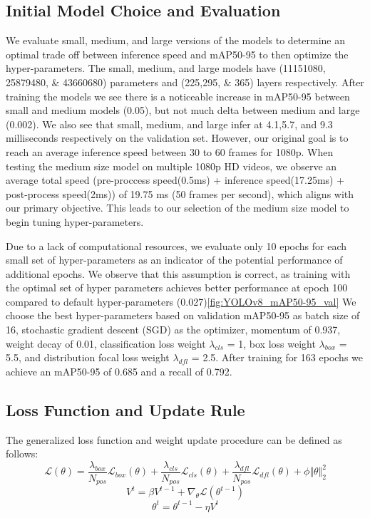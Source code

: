 \documentclass[10pt,twocolumn,letterpaper]{article}
\begin{document}
\subsection{Initial Model Choice and Evaluation}

We evaluate small, medium, and large versions of the models to determine an optimal trade off between inference speed and mAP50-95 to then optimize the hyper-parameters. The small, medium, and large models have (11151080, 25879480, \& 43660680) parameters and (225,295, \& 365) layers respectively. After training the models we see there is a noticeable increase in mAP50-95 between small and medium models (0.05), but not much delta between medium and large (0.002). We also see that small, medium, and large infer at 4.1,5.7, and 9.3 milliseconds respectively on the validation set. However, our original goal is to reach an average inference speed between 30 to 60 frames for 1080p. When testing the medium size model on multiple 1080p HD videos, we observe an average total speed (pre-proccess speed(0.5ms) + inference speed(17.25ms) + post-process speed(2ms)) of 19.75 ms (50 frames per second), which aligns with our primary objective. This leads to our selection of the medium size model to begin tuning hyper-parameters.

Due to a lack of computational resources, we evaluate only 10 epochs for each small set of hyper-parameters as an indicator of the potential performance of additional epochs. We observe that this assumption is correct, as training with the optimal set of hyper parameters achieves better performance at epoch 100 compared to default hyper-parameters (0.027)\ref{fig:YOLOv8_mAP50-95_val} We choose the best hyper-parameters based on validation mAP50-95 as batch size of 16, stochastic gradient descent (SGD) as the optimizer, momentum of 0.937, weight decay of 0.01, classification loss weight $\lambda_{cls}$ = 1, box loss weight $\lambda_{box}$ = 5.5, and distribution focal loss weight $\lambda_{dfl}$ = 2.5. After training for 163 epochs we achieve an mAP50-95 of 0.685 and a recall of 0.792.

\subsection{Loss Function and Update Rule}
The generalized loss function and weight update procedure can be defined as follows: 
\begin{equation}\label{Generalized Loss}
\mathcal{L}(\theta) = \dfrac{\lambda_{box}}{N_{pos}}\mathcal{L}_{box}(\theta) + \dfrac{\lambda_{cls}}{N_{pos}}\mathcal{L}_{cls}(\theta) + \dfrac{\lambda_{dfl}}{N_{pos}}\mathcal{L}_{dfl}(\theta) + \phi\Vert \theta \Vert_2^2
\end{equation}    
\begin{equation}\label{Velocity}
V^t = \beta V^{t-1} + \nabla_{\theta}\mathcal{L}(\theta^{t-1})
\end{equation}    
\begin{equation}\label{Weight Update}
\theta^{t} = \theta^{t-1} - \eta V^{t}
\end{equation}
\end{document}
